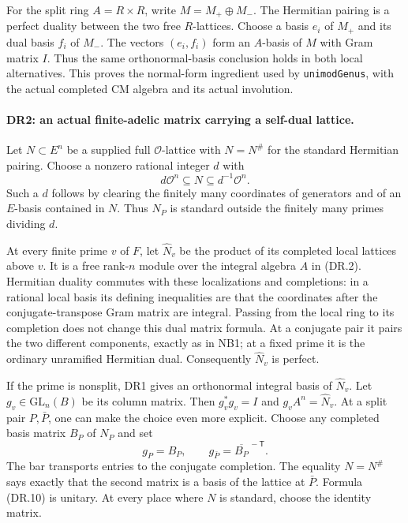 \documentclass[11pt,a4paper]{article}
\numberwithin{equation}{section}
\theoremstyle{remark}\newtheorem{remark}[theorem]{Remark}
\begin{document}
For the split ring $A=R\times R$, write $M=M_+\oplus M_-$.
The Hermitian pairing is a perfect duality between the two free
$R$-lattices. Choose a basis $e_i$ of $M_+$ and its dual basis
$f_i$ of $M_-$. The vectors $(e_i,f_i)$ form an $A$-basis of $M$
with Gram matrix $I$. Thus the same orthonormal-basis conclusion
holds in both local alternatives. This proves the normal-form
ingredient used by \texttt{unimodGenus}, with the actual completed
CM algebra and its actual involution.

\paragraph{DR2: an actual finite-adelic matrix carrying a self-dual lattice.}
Let $N\subset E^n$ be a supplied full $\mathcal O$-lattice with
$N=N^\#$ for the standard Hermitian pairing. Choose a nonzero
rational integer $d$ with
\[
                 d\mathcal O^n\subseteq N
                         \subseteq d^{-1}\mathcal O^n.
 \tag{DR.9}
\]
Such a $d$ follows by clearing the finitely many coordinates of
generators and of an $E$-basis contained in $N$. Thus $N_P$ is
standard outside the finitely many primes dividing $d$.

At every finite prime $v$ of $F$, let $\widehat N_v$ be the product
of its completed local lattices above $v$. It is a free rank-$n$
module over the integral algebra $A$ in (DR.2). Hermitian duality
commutes with these localizations and completions: in a rational
local basis its defining inequalities are that the coordinates
after the conjugate-transpose Gram matrix are integral. Passing
from the local ring to its completion does not change this dual
matrix formula. At a conjugate pair it pairs the two different
components, exactly as in NB1; at a fixed prime it is the ordinary
unramified Hermitian dual. Consequently $\widehat N_v$ is perfect.

If the prime is nonsplit, DR1 gives an orthonormal integral basis
of $\widehat N_v$. Let $g_v\in\mathrm{GL}_n(B)$ be its column
matrix. Then $g_v^*g_v=I$ and $g_v A^n=\widehat N_v$.
At a split pair $P,\bar P$, one can make the choice even more
explicit. Choose any completed basis matrix $B_P$ of $N_P$ and set
\[
              g_P=B_P,\qquad
              g_{\bar P}=\overline{B_P}^{\,-\mathsf T}.
 \tag{DR.10}
\]
The bar transports entries to the conjugate completion.
The equality $N=N^\#$ says exactly that the second matrix is
a basis of the lattice at $\bar P$. Formula (DR.10) is unitary.
At every place where $N$ is standard, choose the identity matrix.
\end{document}
